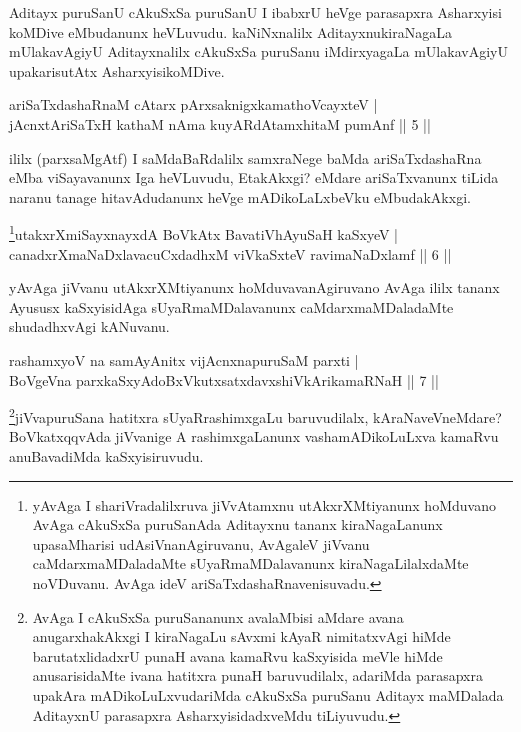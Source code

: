 \begin{artha}
Aditayx puruSanU cAkuSxSa puruSanU I ibabxrU heVge parasapxra Asharxyisi koMDive eMbudanunx heVLuvudu. kaNiNxnalilx Aditayxnu\break kiraNagaLa mUlakavAgiyU Aditayxnalilx cAkuSxSa puruSanu iMdirxyagaLa mUlakavAgiyU upakarisutAtx AsharxyisikoMDive.
\end{artha}

\begin{shl}
ariSaTxdashaRnaM cAtarx pArxsaknigxkamathoVcayxteV | \\
jAcnxtAriSaTxH kathaM nAma kuyARdAtamxhitaM pumAnf \hfill ||  5 || 
\end{shl}

\begin{artha}
ililx (parxsaMgAtf) I saMdaBaRdalilx samxraNege baMda ariSaTxdashaRna eMba viSayavanunx Iga heVLuvudu, EtakAkxgi? eMdare ariSaTxvanunx tiLida naranu tanage hitavAdudanunx heVge mADikoLaLxbeVku eMbudakAkxgi.
\end{artha}

\begin{shl}
\footnote{yAvAga I shariVradalilxruva jiVvAtamxnu utAkxrXMtiyanunx hoMduvano AvAga cAkuSxSa puruSanAda Aditayxnu tananx kiraNagaLanunx upasaMharisi udAsiVnanAgiruvanu, AvAgaleV jiVvanu caMdarxmaMDaladaMte sUyaRmaMDalavanunx kiraNagaLilalxdaMte noVDuvanu. AvAga ideV ariSaTxdashaRnavenisuvadu.}utakxrXmiSayxnayxdA BoVkAtx BavatiVhA\s \s yuSaH kaSxyeV | \\
canadxrXmaNaDxlavacuCxdadhxM viVkaSxteV ravimaNaDxlamf \hfill ||  6 || 
\end{shl}

\begin{artha}
yAvAga jiVvanu utAkxrXMtiyanunx hoMduvavanAgiruvano AvAga ililx tananx Ayususx kaSxyisidAga sUyaRmaMDalavanunx caMdarxmaMDaladaMte shudadhxvAgi kANuvanu.
\end{artha}


\begin{shl}
rashamxyoV na samAyAnitx vijAcnxnapuruSaM parxti | \\
BoVgeVna parxkaSxyAdoBxVkutxsatxdavxshiVkArikamaRNaH \hfill ||  7 || 
\end{shl}

\begin{artha}
\footnote{AvAga I cAkuSxSa puruSananunx avalaMbisi aMdare avana anugarxhakAkxgi I kiraNagaLu sAvxmi kAyaR nimitatxvAgi hiMde barutatxlidadxrU punaH avana kamaRvu kaSxyisida meVle hiMde anusarisidaMte ivana hatitxra punaH baruvudilalx, adariMda parasapxra upakAra mADikoLuLxvudariMda cAkuSxSa puruSanu Aditayx maMDalada AditayxnU parasapxra AsharxyisidadxveMdu tiLiyuvudu.}jiVvapuruSana hatitxra sUyaRrashimxgaLu baruvudilalx, kAraNaveVneMdare? BoVkatxqqvAda jiVvanige A rashimxgaLanunx vashamADikoLuLxva kamaRvu anuBavadiMda kaSxyisiruvudu.
\end{artha}

